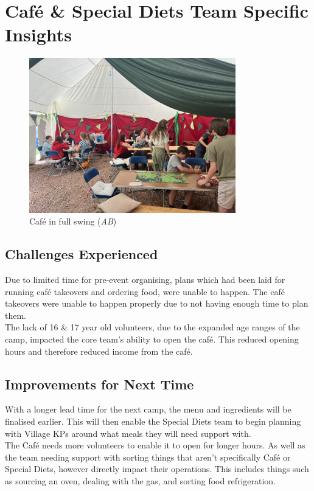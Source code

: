 \section{Café \& Special Diets Team Specific Insights}
\begin{figure}[h]
    \centering
    \includegraphics[width=0.8\textwidth]{assets/cafe-full-swing-ab.jpeg}
    \caption{Café in full swing (\textit{AB})}
\end{figure}
\subsection{Challenges Experienced}
Due to limited time for pre-event organising, plans which had been laid for running café takeovers and ordering food, were unable to happen. The café takeovers were unable to happen properly due to not having enough time to plan them.\\

The lack of 16 \& 17 year old volunteers, due to the expanded age ranges of the camp, impacted the core team's ability to open the café. This reduced opening hours and therefore reduced income from the café.
\subsection{Improvements for Next Time}
With a longer lead time for the next camp, the menu and ingredients will be finalised earlier. This will then enable the Special Diets team to begin planning with Village KPs around what meals they will need support with.\\

The Café needs more volunteers to enable it to open for longer hours. As well as the team needing support with sorting things that aren't specifically Café or Special Diets, however directly impact their operations. This includes things such as sourcing an oven, dealing with the gas, and sorting food refrigeration.
